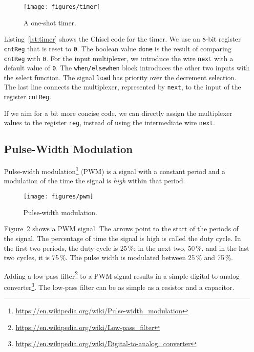 \documentclass[%
    10pt,
    headinclude, footexclude,
    openright, %
    notitlepage,
    cleardoubleempty,
    headsepline,
    pointlessnumbers,
    bibtotoc, idxtotoc,
    ]{scrbook}
\newcommand{\scale}{0.7}
\newcommand{\code}[1]{{\lstinline[basicstyle=\small\ttfamily]{#1}}}
\newcommand{\myref}[2]{\href{#1}{#2}}
\renewcommand{\myref}[2]{{#2}{\footnote{\url{#1}}}}
\begin{document}
\begin{figure}
  \centering
  \texttt{[image: figures/timer]}
  \caption{A one-shot timer.}
  \label{fig:timer}
\end{figure}

Listing~\ref{lst:timer} shows the Chisel code for the timer. We use an 8-bit register \code{cntReg}
that is reset to \code{0}. The boolean value \code{done} is the result of comparing \code{cntReg}
with \code{0}. For the input multiplexer, we introduce the wire \code{next} with a default
value of \code{0}. The \code{when/elsewhen} block introduces the other two inputs with
the select function. The signal \code{load} has priority over the decrement selection.
The last line connects the multiplexer, represented by \code{next}, to the input of the
register \code{cntReg}.


If we aim for a bit more concise code, we can directly assign the multiplexer values to
the register \code{reg}, instead of using the intermediate wire \code{next}.

\subsection{Pulse-Width Modulation}

\myref{https://en.wikipedia.org/wiki/Pulse-width_modulation}{Pulse-width modulation} (PWM)
is a signal with a constant period and a modulation of the time the signal is \emph{high}
within that period.

\begin{figure}
  \centering
  \texttt{[image: figures/pwm]}
  \caption{Pulse-width modulation.}
  \label{fig:pwm}
\end{figure}

Figure~\ref{fig:pwm} shows a PWM signal. The arrows point to the start of the periods
of the signal. The percentage of time the signal is high is called the duty cycle.
In the first two periods, the duty cycle is 25\,\%; in the next two, 50\,\%, and in the last
two cycles, it is 75\,\%. The pulse width is modulated between 25\,\% and 75\,\%.

Adding a \myref{https://en.wikipedia.org/wiki/Low-pass_filter}{low-pass filter} to a PWM
signal results in a simple
\myref{https://en.wikipedia.org/wiki/Digital-to-analog_converter}{digital-to-analog converter}.
The low-pass filter can be as simple as a resistor and a capacitor.
\end{document}
